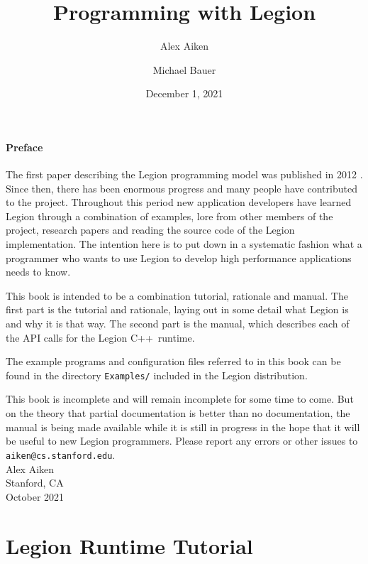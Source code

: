 \documentclass[11pt]{book}
\newcommand{\legionbook}[1]{{\tt Examples/#1}}
\newcommand{\Cpp}{C++}
\begin{document}
\title{Programming with Legion}
\author{Alex Aiken \and Michael Bauer}
\date{December 1, 2021}
\maketitle

\subsection*{Preface}

The first paper describing the Legion programming model
was published in 2012 \cite{Legion12}.  Since then, there has been
enormous progress and many people have contributed to
the project.  Throughout this period new application developers have
learned Legion through a combination of examples, lore from other
members of the project, research papers and reading the source code of
the Legion implementation.  The intention here is to put down in 
a systematic fashion what a programmer who wants to use
Legion to develop high performance applications needs to know.

This book is intended to be a combination tutorial, rationale and
manual.  The first part is the tutorial and rationale, laying out in some
detail what Legion is and why it is that way.  The second part is the manual, which describes
each of the API calls for the Legion \Cpp\ runtime.

The example programs and configuration files referred to in this book can be found in the directory
\legionbook{} included in the Legion distribution.

This book is incomplete and will remain incomplete for
some time to come.  But on the theory that partial documentation is better than no
documentation, the manual is being made available while it is
still in progress in the hope that it will be useful to new Legion
programmers.  Please report any errors or other issues to {\tt
  aiken@cs.stanford.edu}. \\[2in] Alex Aiken\\ Stanford, CA \\
October 2021

\tableofcontents

\part{Legion Runtime Tutorial}












\end{document}
